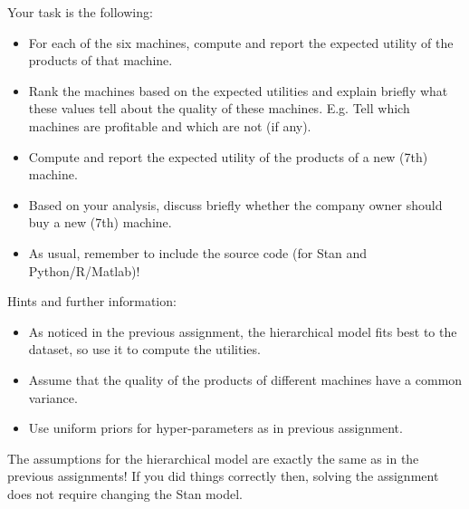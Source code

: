 \documentclass[a4paper,11pt]{article}
\begin{document}
Your task is the following:
\begin{itemize}
\item For each of the six machines, compute and report the expected utility of the products of that machine.
\item Rank the machines based on the expected utilities and explain briefly what these values tell about the quality of these machines. E.g. Tell which machines are profitable and which are not (if any).
\item Compute and report the expected utility of the products of a new (7th) machine.
\item Based on your analysis, discuss briefly whether the company owner should buy a new (7th) machine.
\item As usual, remember to include the source code (for Stan and Python/R/Matlab)!
\end{itemize}

Hints and further information:
\begin{itemize}
\item As noticed in the previous assignment, the hierarchical model fits best to the dataset, so use it to compute the utilities.
\item Assume that the quality of the products of different machines have a common variance.
\item Use uniform priors for hyper-parameters as in previous assignment.
\end{itemize}

The assumptions for the hierarchical model are exactly the same as in the previous assignments! If you did things correctly then, solving the assignment does not require changing the Stan model. 
\end{document}
